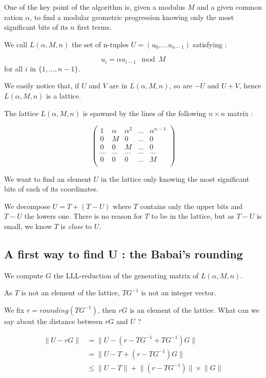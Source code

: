 \documentclass[preprint,svgnames]{iacrtrans}
\begin{document}
One of the key point of the algorithm is, given a modulus \(M\) and a given common ration \(\alpha\), to find a modular geometric progression knowing only the most significant bits of its \(n\) first terms.

We call \(L(\alpha,M,n)\) the set of n-tuples \(U = (u_0,\dots u_{n-1})\) satisfying :

\[u_{i} = \alpha u_{i-1} \mod M \] for all \(i\) in \(\{1,\dots,n-1\}\).


We easily notice that, if \(U\) and \(V\) are in \(L(\alpha,M,n)\), so are \(-U\) and \(U+V\), hence \(L(\alpha,M,n)\) is a lattice.

The lattice \(L(\alpha,M,n)\) is spawned by the lines of the following \(n\times n\) matrix :

\[\begin{pmatrix}
1&\alpha&\alpha^2&\dots&\alpha^{n-1}\\
0&M&0&\dots&0\\
0&0&M&\dots&0\\
\dots&\dots&\dots&\dots&\dots\\
0&0&0&\dots&M\\
\end{pmatrix}\]

We want to find an element \(U\) in the lattice only knowing the most significant bits of each of its coordinates. 


We decompose \(U = T + (T-U)\) where \(T\) contains only the upper bits and \(T-U\) the lowers one. There is no reason for \(T\) to be in the lattice, but as \(T-U\) is small, we know \(T\) is \emph{close} to \(U\).

\subsection{A first way to find U : the Babai's rounding}

We compute \(G\) the LLL-reduction of the generating matrix of \(L(\alpha,M,n)\).

As \(T\) is not an element of the lattice, \(TG^{-1}\) is not an integer vector.

We fix \(r = rounding(TG^{-1}) \), then \(rG\) is an element of the lattice. What can we say about the distance between \(rG\) and \(U\) ?

\begin{align*}
\lVert U - rG \rVert &= \lVert U - (r-TG^{-1} + TG^{-1})G \rVert\\
&= \lVert U - T + (r-TG^{-1})G \rVert\\
&\leqslant \lVert U - T \rVert + \lVert(r-TG^{-1})\rVert \times \lVert G\rVert\\	
\end{align*}
\end{document}
